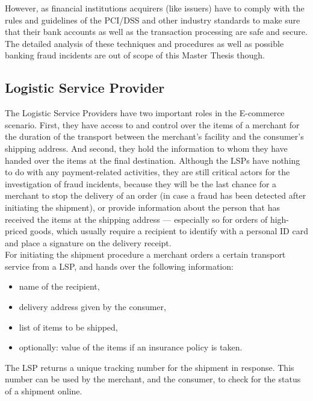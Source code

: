 However, as financial institutions acquirers (like issuers) have to comply with the rules and guidelines of the \gls{PCI/DSS} and other industry standards to make sure that their bank accounts as well as the transaction processing are safe and secure. The detailed analysis of these techniques and procedures as well as possible banking fraud incidents are out of scope of this Master Thesis though.


\subsection{Logistic Service Provider}
\label{subsec:stakeholder_lsp}

The Logistic Service Providers have two important roles in the \gls{E-commerce} scenario. First, they have access to and control over the items of a merchant for the duration of the transport between the merchant's facility and the consumer's shipping address. And second, they hold the information to whom they have handed over the items at the final destination. Although the \gls{LSP}s have nothing to do with any payment-related activities, they are still critical actors for the investigation of fraud incidents, because they will be the last chance for a merchant to stop the delivery of an order (in case a fraud has been detected after initiating the shipment), or provide information about the person  that has received the items at the shipping address --- especially so for orders of high-priced goods, which usually require a recipient to identify with a personal ID card and place a signature on the delivery receipt. \\

For initiating the shipment procedure a merchant orders a certain transport service from a \gls{LSP}, and hands over the following information:\@

\begin{itemize}
	\item name of the recipient,
	\item delivery address given by the consumer,
	\item list of items to be shipped,
	\item optionally: value of the items if an insurance policy is taken.
\end{itemize}

The \gls{LSP} returns a unique tracking number for the shipment in response. This number can be used by the merchant, and the consumer, to check for the status of a shipment online. \\

